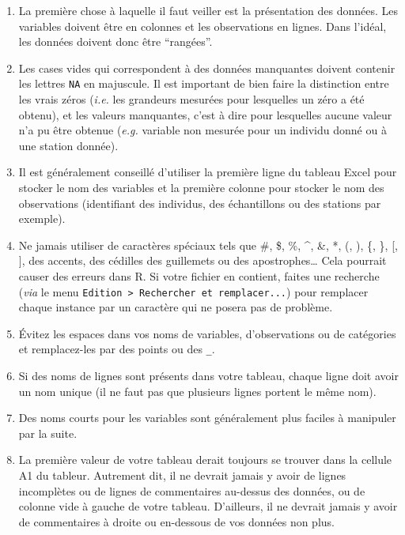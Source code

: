 \documentclass[a4paperpaper,]{article}
\providecommand{\tightlist}{%
  \setlength{\itemsep}{0pt}\setlength{\parskip}{0pt}}
\theoremstyle{definition}
\theoremstyle{definition}
\theoremstyle{definition}
\theoremstyle{remark}
\begin{document}
\begin{enumerate}
\def\labelenumi{\arabic{enumi}.}
\tightlist
\item
  La première chose à laquelle il faut veiller est la présentation des
  données. Les variables doivent être en colonnes et les observations en
  lignes. Dans l'idéal, les données doivent donc être ``rangées''.
\item
  Les cases vides qui correspondent à des données manquantes doivent
  contenir les lettres \texttt{NA} en majuscule. Il est important de
  bien faire la distinction entre les vrais zéros (\emph{i.e.} les
  grandeurs mesurées pour lesquelles un zéro a été obtenu), et les
  valeurs manquantes, c'est à dire pour lesquelles aucune valeur n'a pu
  être obtenue (\emph{e.g.} variable non mesurée pour un individu donné
  ou à une station donnée).
\item
  Il est généralement conseillé d'utiliser la première ligne du tableau
  Excel pour stocker le nom des variables et la première colonne pour
  stocker le nom des observations (identifiant des individus, des
  échantillons ou des stations par exemple).
\item
  Ne jamais utiliser de caractères spéciaux tels que \#, \$, \%, \^{},
  \&, *, (, ), \{, \}, {[}, {]}, des accents, des cédilles des
  guillemets ou des apostrophes\ldots{} Cela pourrait causer des erreurs
  dans R. Si votre fichier en contient, faites une recherche (\emph{via}
  le menu
  \texttt{Edition\ \textgreater{}\ Rechercher\ et\ remplacer...}) pour
  remplacer chaque instance par un caractère qui ne posera pas de
  problème.
\item
  Évitez les espaces dans vos noms de variables, d'observations ou de
  catégories et remplacez-les par des points ou des \texttt{\_}.
\item
  Si des noms de lignes sont présents dans votre tableau, chaque ligne
  doit avoir un nom unique (il ne faut pas que plusieurs lignes portent
  le même nom).
\item
  Des noms courts pour les variables sont généralement plus faciles à
  manipuler par la suite.
\item
  La première valeur de votre tableau derait toujours se trouver dans la
  cellule A1 du tableur. Autrement dit, il ne devrait jamais y avoir de
  lignes incomplètes ou de lignes de commentaires au-dessus des données,
  ou de colonne vide à gauche de votre tableau. D'ailleurs, il ne
  devrait jamais y avoir de commentaires à droite ou en-dessous de vos
  données non plus.
\end{enumerate}
\end{document}
